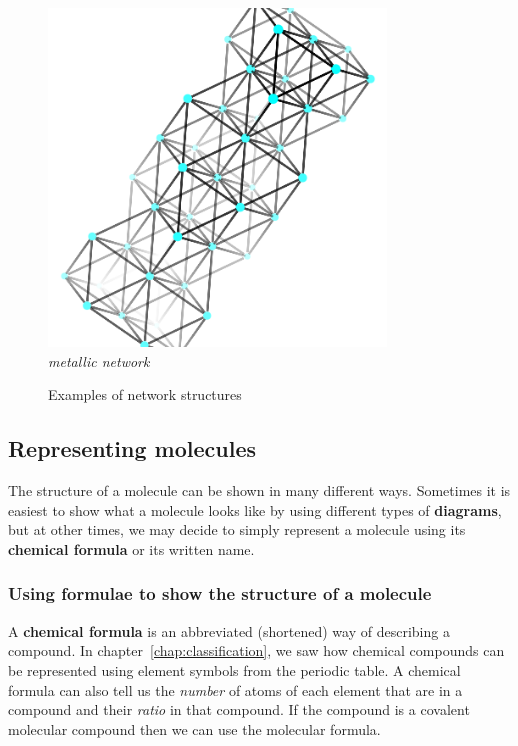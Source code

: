 \begin{figure}[H]
\begin{center}
\begin{minipage}[c]{4.5 cm}
    \includegraphics[width=0.8\textwidth]{photos/copper_structure.png}   \\ 
    \textsl{metallic network}
  \end{minipage}
\caption{Examples of network structures}
\end{center}
\end{figure}

\subsection*{Representing molecules}
            \nopagebreak
\label{m38120*id307557}The structure of a molecule can be shown in many different ways. Sometimes it is easiest to show what a molecule looks like by using different types of \textbf{diagrams}, but at other times, we may decide to simply represent a molecule using its \textbf{chemical formula} or its written name. 

\subsubsection*{Using formulae to show the structure of a molecule}
A \textbf{chemical formula} is an abbreviated (shortened) way of describing a compound. In chapter~\ref{chap:classification}, we saw how chemical compounds can be represented using element symbols from the periodic table. A chemical formula can also tell us the \textsl{number} of atoms of each element that are in a compound and their \textsl{ratio} in that compound. If the compound is a covalent molecular compound then we can use the molecular formula.

